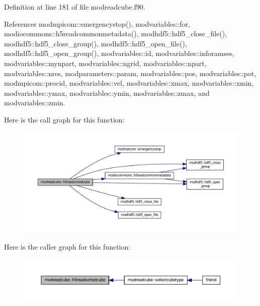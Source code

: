 Definition at line 181 of file modreadcube.\+f90.



References modmpicom\+::emergencystop(), modvariables\+::for, modiocommons\+::h5readcommonmetadata(), modhdf5\+::hdf5\+\_\+close\+\_\+file(), modhdf5\+::hdf5\+\_\+close\+\_\+group(), modhdf5\+::hdf5\+\_\+open\+\_\+file(), modhdf5\+::hdf5\+\_\+open\+\_\+group(), modvariables\+::id, modvariables\+::inforamses, modvariables\+::mynpart, modvariables\+::ngrid, modvariables\+::npart, modvariables\+::nres, modparameters\+::param, modvariables\+::pos, modvariables\+::pot, modmpicom\+::procid, modvariables\+::vel, modvariables\+::xmax, modvariables\+::xmin, modvariables\+::ymax, modvariables\+::ymin, modvariables\+::zmax, and modvariables\+::zmin.



Here is the call graph for this function\+:\nopagebreak
\begin{figure}[H]
\begin{center}
\leavevmode
\includegraphics[width=350pt]{namespacemodreadcube_a30050fd5631222b0125e7917cc8ae547_cgraph}
\end{center}
\end{figure}




Here is the caller graph for this function\+:\nopagebreak
\begin{figure}[H]
\begin{center}
\leavevmode
\includegraphics[width=350pt]{namespacemodreadcube_a30050fd5631222b0125e7917cc8ae547_icgraph}
\end{center}
\end{figure}


